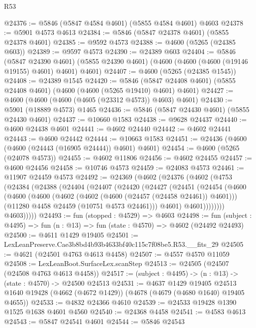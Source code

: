 \begin{lexlean}{R53}
\begin{coremodule}
@24376 := @5846 (@5847 @4584 @4601) (@5855 @4584 @4601) @4603
@24378 := @5901 @4573 @4613
@24384 := @5846 (@5847 @24378 @4601) (@5855 @24378 @4601)
@24385 := @9592 @4573
@24388 := @4600 (@5265 (@24385 @603))
@24389 := @9597 @4573
@24390 := @24389 @603
@24404 := @5846
    (@5847 @24390 @4601)
    (@5855 @24390 @4601)
    (@4600 (@4600 (@4600 (@19146 @19155) @4601) @4601) @4601)
@24407 := @4600 (@5265 (@24385 @1545))
@24408 := @24389 @1545
@24420 := @5846 (@5847 @24408 @4601) (@5855 @24408 @4601) (@4600 (@4600 (@5265 @19410) @4601) @4601)
@24427 := @4600 (@4600 (@4600 (@4605 (@23312 @4573)) @4603) @4601)
@24430 := @5901 (@18889 @4573) @1465
@24436 := @5846 (@5847 @24430 @4601) (@5855 @24430 @4601)
@24437 := @10660 @1583
@24438 := @9628 @24437
@24440 := @4600 @24438 @4601
@24441 := @4602 @24440
@24442 := @4602 @24441
@24443 := @4600 @24442
@24444 := @10663 @1583
@24451 := @24436 (@4600 (@4600 (@24443 (@16905 @24444)) @4601) @4601)
@24454 := @4600 (@5265 (@24078 @4573))
@24455 := @4602 @11806
@24456 := @4602 @24455
@24457 := @4600 @24456
@24458 := @10746 @4573
@24459 := @24083 @4573
@24461 := @11907 @24459 @4573
@24492 := @24369
    (@4602
      (@24376
        (@4602
          (@4753
            (@24384
              (@24388
                (@24404
                  (@24407
                    (@24420
                      (@24427
                        (@24451
                          (@24454
                            (@4600
                              (@4600
                                (@4600
                                  (@4602 (@4602 (@4600 (@24457 (@24458 @24461)) @4601)))
                                  (@11280 @4458 @24459 (@10751 @4573 @24461)))
                                @4601)
                              @4601))))))))
              @4603)))))
@24493 := fun (stopped : @4529) => @4603
@24498 := fun (subject : @4495) => fun (n : @13) => fun (state : @4570) => @4602 (@24492 @24493)
@24500 := @4611 @1429 @19405
@24501 := LexLeanPreserve.Cae3b8bd4b93b4633bf40c115c7f08be5.R53.__fits_29
@24505 := @4621 (@24501 @4763 @4613 @4458)
@24507 := @4557 @4570 @11059
@24508 := LexLeanBoot.SurfaceLex.scanStep
@24513 := @24505 (@24507 (@24508 @4763 @4613 @4458))
@24517 := (subject : @4495) -> (n : @13) -> (state : @4570) -> @24500 @24513
@24531 := @4637
    @1429
    @19405
    @24513
    @1640
    @19428
    (@4662 (@4672 @1429))
    (@4678 (@4679 (@4680 @1640) @19405 @4655))
@24533 := @4832 @24366 @4610
@24539 := @24533 @19428 @1390 @1525 @1638 @4601 @4560
@24540 := @24368 @4458
@24541 := @4583 @4613
@24543 := @5847 @24541 @4601
@24544 := @5846 @24543

\end{coremodule}
\end{lexlean}
